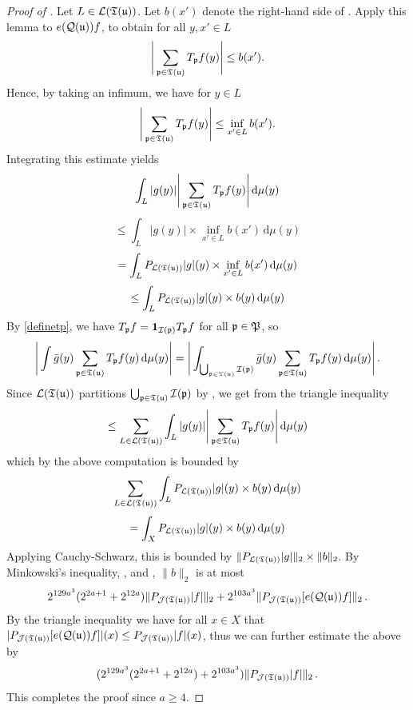 \begin{proof}[Proof of ]
    \leanok
    Let $L \in \mathcal{L}({\mathfrak T}({\mathfrak u}))$.
    Let $b(x')$ denote the right-hand side of . Apply this lemma to $e({\mathcal{Q}}({\mathfrak u})) f$, to obtain for all $y, x' \in L$
    $$
        \Bigg| \sum_{{\mathfrak p} \in {\mathfrak T}({\mathfrak u})} T_{{\mathfrak p}} f(y) \Bigg| \le b(x').
    $$
    Hence, by taking an infimum, we have for $y \in L$
    $$
        \Bigg| \sum_{{\mathfrak p} \in {\mathfrak T}({\mathfrak u})} T_{{\mathfrak p}} f(y) \Bigg| \le \inf_{x' \in L} b(x').
    $$
    Integrating this estimate yields
    $$
        \int_L |g(y)| \Bigg| \sum_{{\mathfrak p} \in {\mathfrak T}({\mathfrak u})} T_{{\mathfrak p}} f(y) \Bigg| \, \mathrm{d}\mu(y)
    $$
    $$
        \le \int_L |g(y)| \times \inf_{x' \in L} b(x') \, \mathrm{d}\mu(y)
    $$
    $$
        =   \int_L P_{\mathcal{L}({\mathfrak T}({\mathfrak u}))}|g|(y) \times \inf_{x' \in L} b(x') \, \mathrm{d}\mu(y)
    $$
    $$
        \le \int_L P_{\mathcal{L}({\mathfrak T}({\mathfrak u}))}|g|(y) \times  b(y) \, \mathrm{d}\mu(y)
    $$
    By \eqref{definetp}, we have $T_{{\mathfrak p}} f = \mathbf{1}_{{\mathcal{I}}({\mathfrak p})} T_{{\mathfrak p}} f$ for all ${\mathfrak p} \in {\mathfrak P}$, so
    $$
        \Bigg| \int \bar g(y) \sum_{{\mathfrak p} \in {\mathfrak T}({\mathfrak u})} T_{{\mathfrak p}} f(y) \, \mathrm{d}\mu(y) \Bigg| = \Bigg| \int_{\bigcup_{{\mathfrak p} \in {\mathfrak T}({\mathfrak u})} {\mathcal{I}}({\mathfrak p})} \bar g(y) \sum_{{\mathfrak p} \in {\mathfrak T}({\mathfrak u})} T_{{\mathfrak p}} f(y) \, \mathrm{d}\mu(y) \Bigg|\,.
    $$
    Since $\mathcal{L}({\mathfrak T}({\mathfrak u}))$ partitions $\bigcup_{{\mathfrak p} \in {\mathfrak T}({\mathfrak u})} {\mathcal{I}}({\mathfrak p})$ by ,
    we get from the triangle inequality
    $$
        \le \sum_{L \in \mathcal{L}({\mathfrak T}({\mathfrak u}))} \int_L |g(y)| \Bigg| \sum_{{\mathfrak p} \in {\mathfrak T}({\mathfrak u})} T_{{\mathfrak p}} f(y) \Bigg| \, \mathrm{d}\mu(y)
    $$
    which by the above computation is bounded by
    $$
        \sum_{L \in \mathcal{L}({\mathfrak T}({\mathfrak u}))} \int_L P_{\mathcal{L}({\mathfrak T}({\mathfrak u}))}|g|(y) \times  b(y) \, \mathrm{d}\mu(y)
    $$
    $$
        = \int_X P_{\mathcal{L}({\mathfrak T}({\mathfrak u}))}|g|(y) \times  b(y) \, \mathrm{d}\mu(y)
    $$
    Applying Cauchy-Schwarz, this is bounded by $\|P_{\mathcal{L}({\mathfrak T}({\mathfrak u}))}|g|\|_2 \times \|b\|_2$.
    By Minkowski's inequality, ,  and , $\|b\|_2$ is at most
    $$
        2^{129a^3} (2^{2a+1} + 2^{12a})\|P_{\mathcal{J}({\mathfrak T}({\mathfrak u}))}|f|\|_2 + 2^{103a^3} \|P_{\mathcal{J}({\mathfrak T}({\mathfrak u}))}[e({\mathcal{Q}}({\mathfrak u}))f]\|_2\,.
    $$
    By the triangle inequality we have for all $x \in X$ that $|P_{\mathcal{J}({\mathfrak T}({\mathfrak u}))}[e({\mathcal{Q}}({\mathfrak u}))f]|(x) \le P_{\mathcal{J}({\mathfrak T}({\mathfrak u}))}|f|(x)$, thus we can further estimate the above by
    $$
        (2^{129a^3} (2^{2a+1} + 2^{12a}) + 2^{103a^3}) \|P_{\mathcal{J}({\mathfrak T}({\mathfrak u}))}|f|\|_2\,.
    $$
    This completes the proof since $a \ge 4$.
\end{proof}

